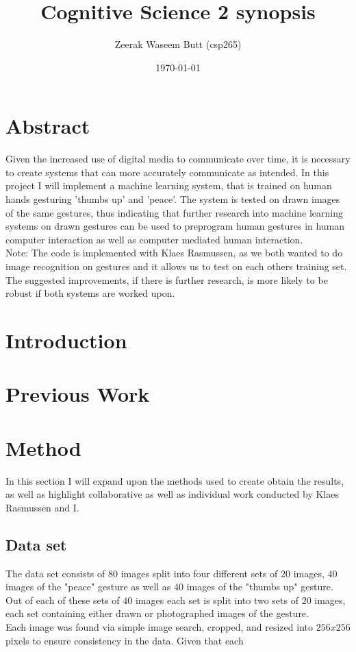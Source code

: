 \documentclass[10pt, a4paper]{article}
\begin{document}
\title{Cognitive Science 2 synopsis}
\author{Zeerak Waseem Butt (csp265)}
\date{\today}
\maketitle
\thispagestyle{empty}
\newpage
\tableofcontents
\thispagestyle{empty}
\newpage
\setcounter{page}{1}
\section{Abstract}
Given the increased use of digital media to communicate over time, it is necessary to create systems that can more accurately communicate as intended. In this project I will implement a machine learning system, that is trained on human hands gesturing 'thumbs up' and 'peace'. The system is tested on drawn images of the same gestures, thus indicating that further research into machine learning systems on drawn gestures can be used to preprogram human gestures in human computer interaction as well as computer mediated human interaction.\\

Note: The code is implemented with Klaes Rasmussen, as we both wanted to do image recognition on gestures and it allows us to test on each others training set. The suggested improvements, if there is further research, is more likely to be robust if both systems are worked upon.
\section{Introduction}

\section{Previous Work}
\section{Method}
In this section I will expand upon the methods used to create obtain the results, as well as highlight collaborative as well as individual work conducted by Klaes Rasmussen and I.
\subsection{Data set}
The data set consists of \(80\) images split into four different sets of \(20\) images, \(40\) images of the "peace" gesture as well as \(40\) images of the "thumbs up" gesture. Out of each of these sets of \(40\) images each set is split into two sets of \(20\) images, each set containing either drawn or photographed images of the gesture.\\
Each image was found via simple image search, cropped, and resized into \(256x256\) pixels to ensure consistency in the data. Given that each 
\end{document}

